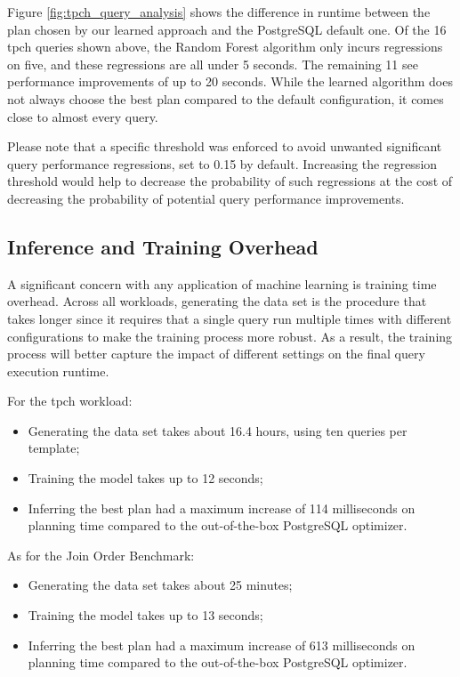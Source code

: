 Figure \ref{fig:tpch_query_analysis} shows the difference in runtime between the plan chosen by our learned approach and the PostgreSQL default one. Of the 16 \gls{tpch} queries shown above, the Random Forest algorithm only incurs regressions on five, and these regressions are all under 5 seconds. The remaining 11 see performance improvements of up to 20 seconds. While the learned algorithm does not always choose the best plan compared to the default configuration, it comes close to almost every query.

Please note that a specific threshold was enforced to avoid unwanted significant query performance regressions, set to 0.15 by default. Increasing the regression threshold would help to decrease the probability of such regressions at the cost of decreasing the probability of potential query performance improvements.

\subsection{Inference and Training Overhead}

A significant concern with any application of machine learning is training time overhead. Across all workloads, generating the data set is the procedure that takes longer since it requires that a single query run multiple times with different configurations to make the training process more robust. As a result, the training process will better capture the impact of different settings on the final query execution runtime.

For the \gls{tpch} workload:

\begin{itemize}
    \item Generating the data set takes about 16.4 hours, using ten queries per template;
    \item Training the model takes up to 12 seconds;
    \item Inferring the best plan had a maximum increase of 114 milliseconds on planning time compared to the out-of-the-box PostgreSQL optimizer.
\end{itemize}

As for the Join Order Benchmark:

\begin{itemize}
    \item Generating the data set takes about 25 minutes;
    \item Training the model takes up to 13 seconds;
    \item Inferring the best plan had a maximum increase of 613 milliseconds on planning time compared to the out-of-the-box PostgreSQL optimizer.
\end{itemize}

